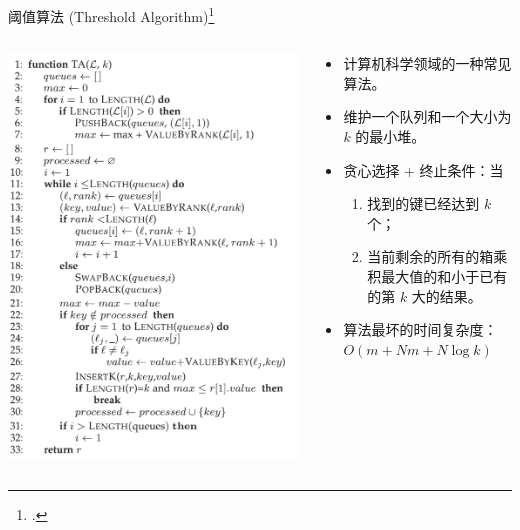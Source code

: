 \documentclass[10pt,aspectratio=169]{ctexbeamer}
\begin{document}
\begin{frame}{阈值算法 (Threshold Algorithm)\footcite{FAGIN2003614}}
    \begin{columns}
        \begin{column}{.3\textwidth}
            \includegraphics[width=\textwidth]{pic/ta.png}
        \end{column}
        \begin{column}{.7\textwidth}\pause
            \begin{itemize}[<+->]
                \item 计算机科学领域的一种常见算法。
                \item 维护一个队列和一个大小为 $k$ 的最小堆。
                \item 贪心选择 + 终止条件：当
                      \begin{enumerate}
                          \item 找到的键已经达到 $k$ 个；
                          \item 当前剩余的所有的箱乘积最大值的和小于已有的第 $k$ 大的结果。
                      \end{enumerate}
                \item 算法最坏的时间复杂度：$O(m + Nm + N \log k)$
            \end{itemize}
        \end{column}
    \end{columns}
\end{frame}
\end{document}
